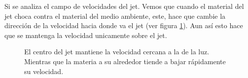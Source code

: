 \documentclass[12pt,a4paper]{book}
\begin{document}
Si se analiza el campo de velocidades del jet. Vemos que cuando el material del jet choca contra el material del medio ambiente, este, hace que cambie la dirección de la velocidad hacia donde va el jet (ver figura \ref{fig:jet_vec_ma_500}). Aun así esto hace que se mantenga la velocidad unicamente sobre el jet. 

\begin{figure}
\centering
{}
\caption{\label{fig:jet_vec_ma_500} El centro del jet mantiene la velocidad cercana a la de la luz. Mientras que la materia a su alrededor tiende a bajar rápidamente su velocidad.}
\end{figure}
\end{document}
